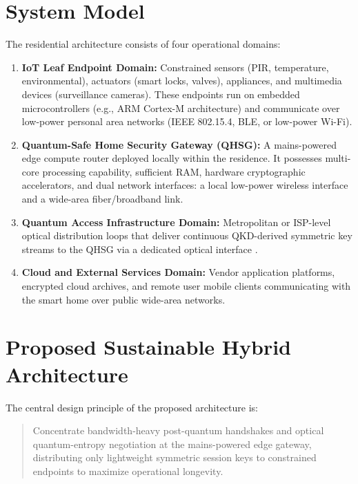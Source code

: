 \documentclass[journal]{IEEEtran}
\begin{document}
\section{System Model}

The residential architecture consists of four operational domains:
\begin{enumerate}
    \item \textbf{IoT Leaf Endpoint Domain:} Constrained sensors (PIR, temperature, environmental),
    actuators (smart locks, valves), appliances, and multimedia devices (surveillance cameras).
    These endpoints run on embedded microcontrollers (e.g., ARM Cortex-M architecture) and
    communicate over low-power personal area networks (IEEE 802.15.4, BLE, or low-power Wi-Fi).
    \item \textbf{Quantum-Safe Home Security Gateway (QHSG):} A mains-powered edge compute
    router deployed locally within the residence. It possesses multi-core processing capability,
    sufficient RAM, hardware cryptographic accelerators, and dual network interfaces: a local
    low-power wireless interface and a wide-area fiber/broadband link.
    \item \textbf{Quantum Access Infrastructure Domain:} Metropolitan or ISP-level optical
    distribution loops that deliver continuous QKD-derived symmetric key streams to the QHSG
    via a dedicated optical interface \cite{cao2022quantum}.
    \item \textbf{Cloud and External Services Domain:} Vendor application platforms, encrypted
    cloud archives, and remote user mobile clients communicating with the smart home over
    public wide-area networks.
\end{enumerate}


\section{Proposed Sustainable Hybrid Architecture}

The central design principle of the proposed architecture is:
\begin{quote}
Concentrate bandwidth-heavy post-quantum handshakes and optical quantum-entropy negotiation
at the mains-powered edge gateway, distributing only lightweight symmetric session keys
to constrained endpoints to maximize operational longevity.
\end{quote}
\end{document}

